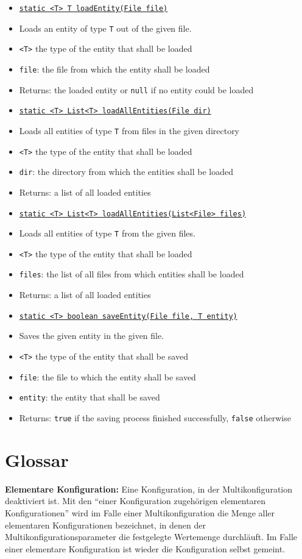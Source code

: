 \documentclass[parskip=full,11pt]{scrartcl}
\begin{document}
\begin{itemize}\itemsep -10pt
	\item \underline{\texttt{static <T> T loadEntity(File file)}}
	\item[] Loads an entity of type \texttt{T} out of the given file. 
	\item[] \texttt{<T>} the type of the entity that shall be loaded
	\item[] \texttt{file}: the file from which the entity shall be loaded
	\item[]Returns: the loaded entity or \texttt{null} if no entity could be loaded
	
	\item \underline{\texttt{static <T> List<T> loadAllEntities(File dir)}}
	\item[] Loads all entities of type \texttt{T} from files in the given directory
	\item[] \texttt{<T>} the type of the entity that shall be loaded
	\item[] \texttt{dir}: the directory from which the entities shall be loaded
	\item[]Returns: a list of all loaded entities
	
	\item \underline{\texttt{static <T> List<T> loadAllEntities(List<File> files)}}
	\item[] Loads all entities of type \texttt{T} from the given files.
	\item[] \texttt{<T>} the type of the entity that shall be loaded
	\item[] \texttt{files}: the list of all files from which entities shall be loaded
	\item[]Returns: a list of all loaded entities
	
	\item \underline{\texttt{static <T> boolean saveEntity(File file, T entity)}}
	\item[] Saves the given entity in the given file.
	\item[] \texttt{<T>} the type of the entity that shall be saved
	\item[] \texttt{file}: the file to which the entity shall  be saved
	\item[] \texttt{entity}: the entity that shall be saved
	\item[]Returns: \texttt{true} if the saving process finished successfully, \texttt{false} otherwise
\end{itemize}

\section{Glossar}
\textbf{Elementare Konfiguration:}
Eine Konfiguration, in der Multikonfiguration deaktiviert ist. Mit den \enquote{einer Konfiguration zugehörigen elementaren Konfigurationen} wird im Falle einer Multikonfiguration die Menge aller elementaren Konfigurationen bezeichnet, in denen der Multikonfigurationsparameter die festgelegte Wertemenge durchläuft. Im Falle einer elementare Konfiguration ist wieder die Konfiguration selbst gemeint.
\end{document}

